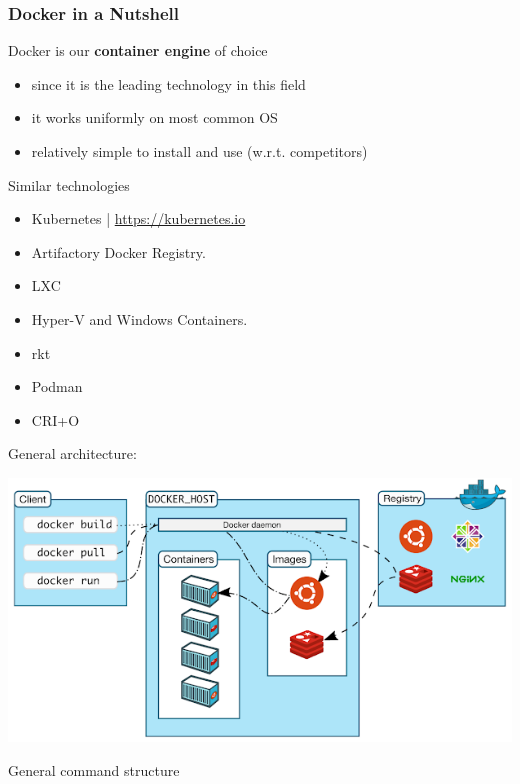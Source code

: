 \documentclass[presentation]{beamer}\mode<presentation>{\usetheme{AMSBolognaFC}}
\begin{document}
\begin{frame}[allowframebreaks]
\frametitle{Docker in a Nutshell}

    \begin{block}{Docker is our \textbf{container engine} of choice}
        \begin{itemize}
            \item since it is the leading technology in this field
            \item it works uniformly on most common OS
            \item relatively simple to install and use (w.r.t. competitors)
        \end{itemize}
    \end{block}

    \begin{block}{Similar technologies}
        \begin{itemize}
            \item Kubernetes | \url{https://kubernetes.io}
            \item Artifactory Docker Registry.
            \item LXC
            \item Hyper-V and Windows Containers.
            \item rkt
            \item Podman
            \item CRI+O
        \end{itemize}
    \end{block}
    \framebreak
    General architecture:
    \begin{center}
        \includegraphics[width=.8\linewidth]{img/client-vs-daemon.png}
    \end{center}

    \framebreak

    \begin{block}{General command structure}
        \centering\ttfamily


\end{block}
\end{frame}
\end{document}
